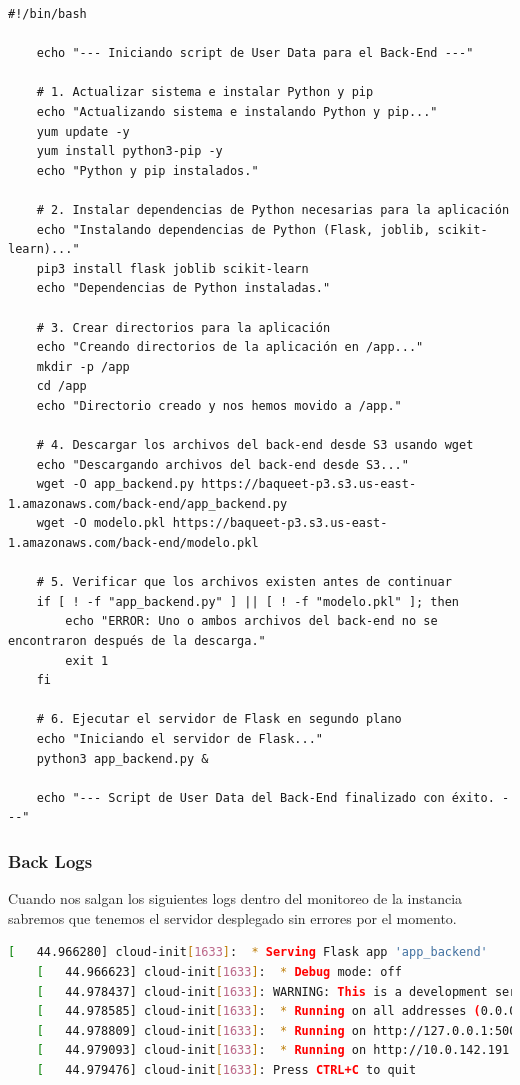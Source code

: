 \documentclass{article}
\begin{document}
	\begin{lstlisting}[style=python-style, caption= back user data sh]
	#!/bin/bash

	echo "--- Iniciando script de User Data para el Back-End ---"

	# 1. Actualizar sistema e instalar Python y pip
	echo "Actualizando sistema e instalando Python y pip..."
	yum update -y
	yum install python3-pip -y
	echo "Python y pip instalados."

	# 2. Instalar dependencias de Python necesarias para la aplicación
	echo "Instalando dependencias de Python (Flask, joblib, scikit-learn)..."
	pip3 install flask joblib scikit-learn
	echo "Dependencias de Python instaladas."

	# 3. Crear directorios para la aplicación
	echo "Creando directorios de la aplicación en /app..."
	mkdir -p /app
	cd /app
	echo "Directorio creado y nos hemos movido a /app."

	# 4. Descargar los archivos del back-end desde S3 usando wget
	echo "Descargando archivos del back-end desde S3..."
	wget -O app_backend.py https://baqueet-p3.s3.us-east-1.amazonaws.com/back-end/app_backend.py
	wget -O modelo.pkl https://baqueet-p3.s3.us-east-1.amazonaws.com/back-end/modelo.pkl

	# 5. Verificar que los archivos existen antes de continuar
	if [ ! -f "app_backend.py" ] || [ ! -f "modelo.pkl" ]; then
		echo "ERROR: Uno o ambos archivos del back-end no se encontraron después de la descarga."
		exit 1
	fi

	# 6. Ejecutar el servidor de Flask en segundo plano
	echo "Iniciando el servidor de Flask..."
	python3 app_backend.py &

	echo "--- Script de User Data del Back-End finalizado con éxito. ---"

	\end{lstlisting}

	\subsubsection{Back Logs}
	Cuando nos salgan los siguientes logs dentro del monitoreo de la instancia sabremos que tenemos el servidor desplegado sin errores por el momento.

	\begin{lstlisting}[style=consola, language=bash, caption={back logs}]
	[   44.966280] cloud-init[1633]:  * Serving Flask app 'app_backend'
	[   44.966623] cloud-init[1633]:  * Debug mode: off
	[   44.978437] cloud-init[1633]: WARNING: This is a development server. Do not use it in a production deployment. Use a production WSGI server instead.
	[   44.978585] cloud-init[1633]:  * Running on all addresses (0.0.0.0)
	[   44.978809] cloud-init[1633]:  * Running on http://127.0.0.1:5000
	[   44.979093] cloud-init[1633]:  * Running on http://10.0.142.191:5000
	[   44.979476] cloud-init[1633]: Press CTRL+C to quit\end{lstlisting}
\end{document}
